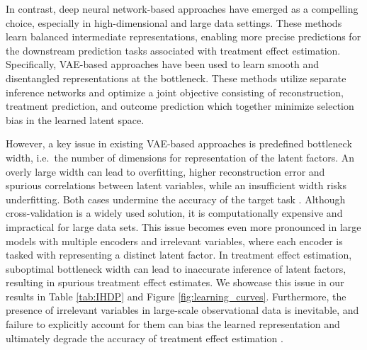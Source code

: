 \documentclass[doubleblind]{ecai}
\begin{document}
	
	
		
	
	In contrast, deep neural network-based approaches \citep{Johansson,UriSha,SITE,Negar_2} have emerged as a compelling choice, especially in high-dimensional and large data settings. These methods learn balanced intermediate representations, enabling more precise predictions for the downstream prediction tasks associated with treatment effect estimation. Specifically, VAE-based approaches  \citep{CEVAE,TEDEV,vowels2021targeted} have been used to learn smooth and disentangled representations at the bottleneck. These methods utilize separate inference networks and optimize a joint objective consisting of reconstruction, treatment prediction, and outcome prediction which together minimize selection bias in the learned latent space.
	
	However, a key issue in existing VAE-based approaches is predefined bottleneck width, i.e.\ the number of dimensions for representation of the latent factors. An overly large width can lead to overfitting, higher reconstruction error and spurious correlations between latent variables, while an insufficient width risks underfitting. Both cases undermine the accuracy of the target task \citep{bonheme2023the}. Although cross-validation is a widely used solution, it is computationally expensive and impractical for large data sets. This issue becomes even more pronounced in large models with multiple encoders and irrelevant variables, where each encoder is tasked with representing a distinct latent factor. In treatment effect estimation, suboptimal bottleneck width can lead to inaccurate inference of latent factors, resulting in spurious treatment effect estimates. We showcase this issue in our results in Table \ref{tab:IHDP} and Figure \ref{fig:learning_curves}.
	Furthermore, the presence of irrelevant variables in large-scale observational data is inevitable, and failure to explicitly account for them can bias the learned representation and ultimately degrade the accuracy of treatment effect estimation \citep{Khan2024OnTE}.
	
\end{document}
